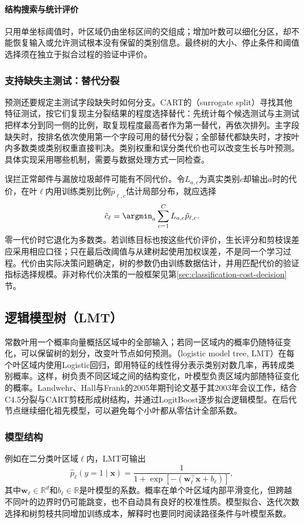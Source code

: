 \paragraph{结构搜索与统计评价}
只用单坐标阈值时，叶区域仍由坐标区间的交组成；增加叶数可以细化分区，却不能恢复输入或允许测试根本没有保留的类别信息。最终树的大小、停止条件和阈值选择须在独立于拟合过程的验证中评价。

\subsubsection{支持缺失主测试：替代分裂}
\label{sec:classification-cart-surrogate}
预测还要规定主测试字段缺失时如何分支。CART的（surrogate split）寻找其他特征测试，按它们复现主分裂结果的程度选择替代：先统计每个候选测试与主测试把样本分到同一侧的比例，取复现程度最高者作为第一替代，再依次排列。主字段缺失时，按排名依次使用第一个字段可用的替代分裂；全部替代都缺失时，才按叶内多数类或类别权重直接判决。类别权重和误分类代价也可以改变生长与叶预测。具体实现采用哪些机制，需要与数据处理方式一同检查。

误拦正常邮件与漏放垃圾邮件可能有不同代价。令$L_{a,c}$为真实类别$c$却输出$a$时的代价，在叶$\ell$内用训练类别比例$\hat p_{\ell,c}$估计局部分布，就应选择
\[
  \hat c_\ell=\argmin_a\sum_{c=1}^C L_{a,c}\hat p_{\ell,c}.
\]
零一代价时它退化为多数类。若训练目标也按这些代价评价，生长评分和剪枝误差应采用相应口径；只在最后改阈值与从建树起使用加权误差，不是同一个学习过程。代价由实际决策问题确定，树的参数仍由训练数据估计，并用匹配代价的验证指标选择规模。非对称代价决策的一般框架见第\ref{sec:classification-cost-decision}节。

\subsection{逻辑模型树（LMT）}
\label{sec:classification-lmt}

常数叶用一个概率向量概括区域中的全部输入；若同一区域内的概率仍随特征变化，可以保留树的划分，改变叶节点如何预测。（logistic model tree, LMT）在每个叶区域内使用Logistic回归，即用特征的线性得分表示类别对数几率，再转成类别概率。这样，树负责不同区域之间的结构变化，叶模型负责区域内部随特征变化的概率。Landwehr、Hall与Frank的2005年期刊论文基于其2003年会议工作，结合C4.5分裂与CART剪枝形成树结构，并通过LogitBoost逐步拟合逻辑模型。在后代节点继续细化祖先模型，可以避免每个小叶都从零估计全部系数。

\subsubsection{模型结构}
例如在二分类叶区域$\ell$内，LMT可输出
\begin{equation}
  \hat p_\ell(y=1\mid\bm{x})
  =\frac{1}{1+\exp[-(\bm{w}_\ell^\top\bm{x}+b_\ell)]},
  \label{eq:classification-lmt-leaf}
\end{equation}
其中$\bm{w}_\ell\in\mathbb{R}^d$和$b_\ell\in\mathbb{R}$是叶模型的系数。概率在单个叶区域内部平滑变化，但跨越不同叶的边界时仍可能跳变，也不自动具有良好的校准性质。模型拟合、迭代次数选择和树剪枝共同增加训练成本，解释时也要同时阅读路径条件与叶模型系数。

